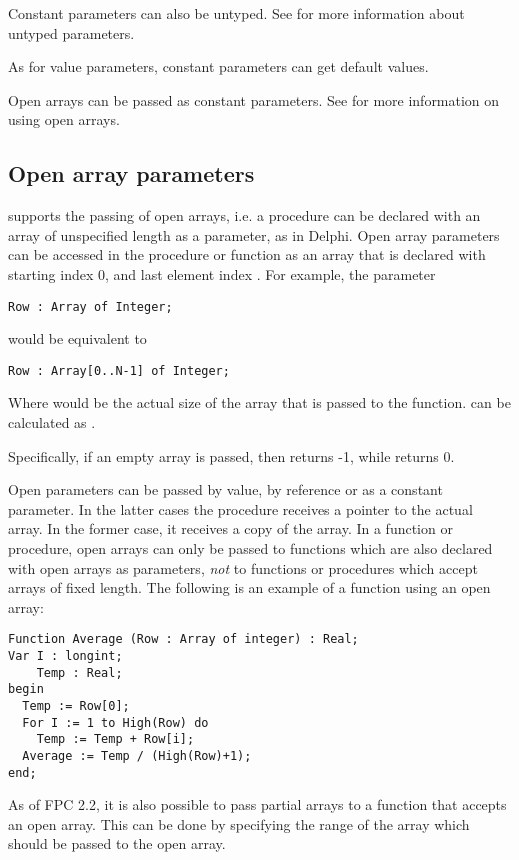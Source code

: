 Constant parameters can also be untyped. See  for more
information about untyped parameters.

As for value parameters, constant parameters can get default values.

Open arrays can be passed as constant parameters. See  for
more information on using open arrays.

\subsection{Open array parameters}
\label{se:openarray}
\fpc supports the passing of open arrays, i.e. a procedure can be declared
with an array of unspecified length as a parameter, as in Delphi.
Open array parameters can be accessed in the procedure or function as an
array that is declared with starting index 0, and last element
index .
For example, the parameter
\begin{verbatim}
Row : Array of Integer;
\end{verbatim}
would be equivalent to
\begin{verbatim}
Row : Array[0..N-1] of Integer;
\end{verbatim}
Where   would be the actual size of the array that is passed to the
function.  can be calculated as .

Specifically, if an empty array is passed, then  returns -1, 
while  returns 0.

Open parameters can be passed by value, by reference or as a constant
parameter. In the latter cases the procedure receives a pointer to the
actual array. In the former case, it receives a copy of the array.
In a function or procedure, open arrays can only be passed to functions which
are also declared with open arrays as parameters, {\em not} to functions or
procedures which accept arrays of fixed length.
The following is an example of a function using an open array:
\begin{verbatim}
Function Average (Row : Array of integer) : Real;
Var I : longint;
    Temp : Real;
begin
  Temp := Row[0];
  For I := 1 to High(Row) do
    Temp := Temp + Row[i];
  Average := Temp / (High(Row)+1);
end;
\end{verbatim}

As of FPC 2.2, it is also possible to pass partial arrays to a function that
accepts an open array. This can be done by specifying the range of the array
which should be passed to the open array.

